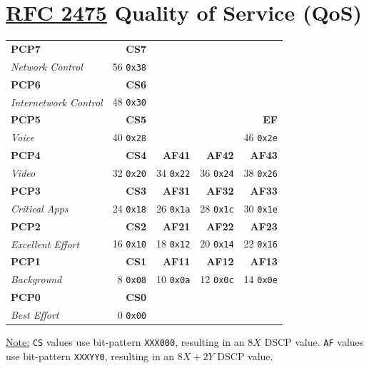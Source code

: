 \documentclass[12pt]{article}
\newif\ifcolor											%
\newcommand{\note}[1]{\ifcolor \colorbox{#1}{Note:}\else \underline{Note:}\fi}
\newcommand{\RFC}[1]{\href{https://datatracker.ietf.org/doc/html/rfc#1}{RFC #1}}
\begin{document}
\section[RFC 2475 QoS]{\RFC{2475} Quality of Service (QoS) \label{sec:QOS}}
	\begin{table}[H]
	\centering
	\begin{tabular}{ l r r r r }
	\textbf{PCP7}			& \textbf{CS7}	&			&			&\\
	\textit{Network Control}	& 56 \texttt{0x38}	&			&			&\\
	\textbf{PCP6}			& \textbf{CS6}	&			&			&\\
	\textit{Internetwork Control}	& 48 \texttt{0x30}	&			&			&\\
	\textbf{PCP5}			& \textbf{CS5}	&			&			& \textbf{EF}\\
	\textit{Voice}			& 40 \texttt{0x28}	&			&			& 46 \texttt{0x2e}\\
	\textbf{PCP4}			& \textbf{CS4}	& \textbf{AF41}	& \textbf{AF42}	& \textbf{AF43}\\
	\textit{Video}			& 32 \texttt{0x20} & 34 \texttt{0x22} & 36 \texttt{0x24} & 38 \texttt{0x26}\\
	\textbf{PCP3}			& \textbf{CS3}	& \textbf{AF31}	& \textbf{AF32}	& \textbf{AF33}\\
	\textit{Critical Apps}		& 24 \texttt{0x18} & 26 \texttt{0x1a} & 28 \texttt{0x1c} & 30 \texttt{0x1e}\\
	\textbf{PCP2}			& \textbf{CS2}	& \textbf{AF21}	& \textbf{AF22}	& \textbf{AF23}\\
	\textit{Excellent Effort}		& 16 \texttt{0x10} & 18 \texttt{0x12} & 20 \texttt{0x14} & 22 \texttt{0x16}\\
	\textbf{PCP1}			& \textbf{CS1}	& \textbf{AF11}	& \textbf{AF12}	& \textbf{AF13}\\
	\textit{Background}		& 8 \texttt{0x08}	& 10 \texttt{0x0a} & 12 \texttt{0x0c} & 14 \texttt{0x0e}\\
	\textbf{PCP0}			& \textbf{CS0}	&			&			&\\
	\textit{Best Effort}			& 0 \texttt{0x00} 	&			&			&\\
	\end{tabular}\end{table}
	\note{Goldenrod} \texttt{CS} values use bit-pattern \texttt{XXX000}, resulting in an $8X$ DSCP value. \texttt{AF} values use bit-pattern \texttt{XXXYY0}, resulting in an $8X+2Y$ DSCP value.
\end{document}
